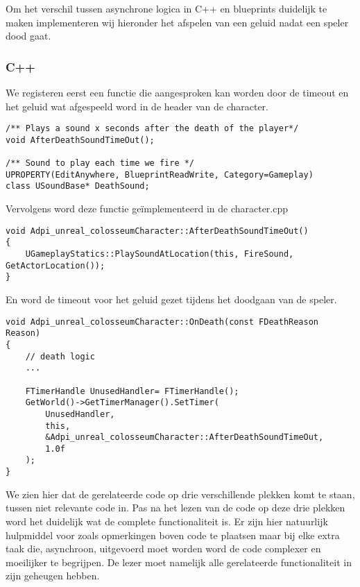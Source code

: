 Om het verschil tussen asynchrone logica in C++ en blueprints duidelijk te maken implementeren wij hieronder het afspelen van een geluid nadat een speler dood gaat.

\subsubsection{C++}
We registeren eerst een functie die aangesproken kan worden door de timeout en het geluid wat afgespeeld word in de header van de character.

\begin{lstlisting}[caption=Registratie van de timeout functie en het geluid]	
/** Plays a sound x seconds after the death of the player*/
void AfterDeathSoundTimeOut();

/** Sound to play each time we fire */
UPROPERTY(EditAnywhere, BlueprintReadWrite, Category=Gameplay)
class USoundBase* DeathSound;
\end{lstlisting}

Vervolgens word deze functie geïmplementeerd in de character.cpp

\begin{lstlisting}[caption=Registratie van de timeout functie en het geluid]
void Adpi_unreal_colosseumCharacter::AfterDeathSoundTimeOut() 
{
	UGameplayStatics::PlaySoundAtLocation(this, FireSound, GetActorLocation());
}
\end{lstlisting}

En word de timeout voor het geluid gezet tijdens het doodgaan van de speler.

\begin{lstlisting}[caption=Implementatie van de OnDeath functie]
void Adpi_unreal_colosseumCharacter::OnDeath(const FDeathReason Reason)
{
	// death logic
	...

	FTimerHandle UnusedHandler= FTimerHandle();
	GetWorld()->GetTimerManager().SetTimer(
		UnusedHandler, 
		this, 
		&Adpi_unreal_colosseumCharacter::AfterDeathSoundTimeOut, 
		1.0f
	);
}
\end{lstlisting}

We zien hier dat de gerelateerde code op drie verschillende plekken komt te staan, tussen niet relevante code in. Pas na het lezen van de code op deze drie plekken word het duidelijk wat de complete functionaliteit is. Er zijn hier natuurlijk hulpmiddel voor zoals opmerkingen boven code te plaatsen maar bij elke extra taak die, asynchroon, uitgevoerd moet worden word de code complexer en moeilijker te begrijpen. De lezer moet namelijk alle gerelateerde functionaliteit in zijn geheugen hebben.

